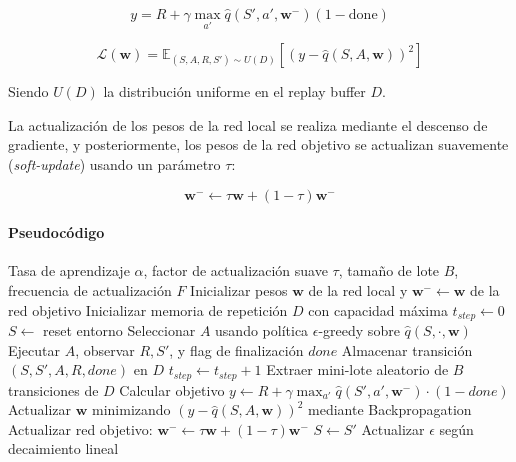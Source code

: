 
\begin{equation*}
y = R + \gamma \max_{a'} \hat{q}(S', a', \mathbf{w}^-) (1-\text{done})
\end{equation*}

\begin{equation*}
\mathcal{L}(\mathbf{w}) =
\mathbb{E}_{(S,A,R,S') \sim U(D)}
\left[
\left(
y - \hat{q}(S,A,\mathbf{w})
\right)^2
\right]
\end{equation*}

Siendo $U(D)$ la distribución uniforme en el replay buffer $D$.

La actualización de los pesos de la red local se realiza mediante el descenso de gradiente, y posteriormente, los pesos de la red objetivo se actualizan suavemente (\textit{soft-update}) usando un parámetro $\tau$:

$$
\mathbf{w}^- \leftarrow \tau \mathbf{w} + (1 - \tau) \mathbf{w}^-
$$



\paragraph{Pseudocódigo}\mbox{}
\begin{algorithm}[H]
\caption{Deep Q-Learning con Replay Buffer}
\begin{algorithmic}[1]
\small
\Require Tasa de aprendizaje $\alpha$, factor de actualización suave $\tau$, tamaño de lote $B$, frecuencia de actualización $F$
\State Inicializar pesos $\mathbf{w}$ de la red local y $\mathbf{w}^- \gets \mathbf{w}$ de la red objetivo
\State Inicializar memoria de repetición $D$ con capacidad máxima
\State $t_{step} \gets 0$
\State $S \gets$ reset entorno
\State Seleccionar $A$ usando política $\epsilon$-greedy sobre $\hat{q}(S, \cdot, \mathbf{w})$
\State Ejecutar $A$, observar $R, S'$, y flag de finalización $done$
\State Almacenar transición $(S, S', A, R, done)$ en $D$
\State $t_{step} \gets t_{step} + 1$
\State Extraer mini-lote aleatorio de $B$ transiciones de $D$
\State Calcular objetivo $y \gets R + \gamma \max_{a'} \hat{q}(S', a', \mathbf{w}^-) \cdot (1 - done)$
\State Actualizar $\mathbf{w}$ minimizando $(y - \hat{q}(S, A, \mathbf{w}))^2$ mediante Backpropagation
\State Actualizar red objetivo: $\mathbf{w}^- \gets \tau \mathbf{w} + (1 - \tau)\mathbf{w}^-$
\EndIf
\State $S \gets S'$
\EndWhile
\State Actualizar $\epsilon$ según decaimiento lineal
\EndFor
\end{algorithmic}
\end{algorithm}


